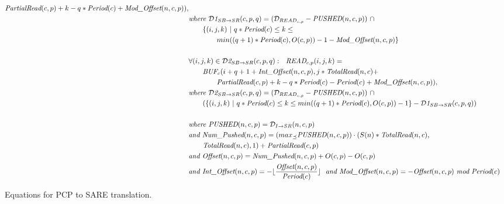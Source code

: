 \begin{figure}[ht]
{\begin{minipage}{6.3in}
\begin{itemize}
\begin{align}
                    \mt{PartialRead}(c,p) + k
                   - q * \mt{Period}(c) + \mt{Mod\_Offset}(n,c,p)), \\
&\mt{where }{{\cal D}\mt{1}}_{SB \rightarrow SR}(c,p,q) = 
  ({\cal D}_{{READ}_{c, p}} - \mt{PUSHED}(n,c,p))
                         ~\cap~ \\ \nonumber
	&~~~~~~\{ (i,j,k)~|~q * \mt{Period}(c)
                                \le k 
                                \le \\ \nonumber
	&~~~~~~~~~~~~min((q+1)*\mt{Period}(c),
         O(c, p)) - 1 
         - \mt{Mod\_Offset}(n,c,p) \}\\ \nonumber\\
\label{buf2read1}
%
%
&\forall (i,j,k) \in {{\cal D}\mt{2}}_{SB \rightarrow SR}(c,p,q):~~
\mt{READ}_{c, p}(i,j,k) = \nonumber\\
    &~~~~~~\mt{BUF}_{c}(i+q+
                  1 + \mt{Int\_Offset}(n,c,p),
                  j*\mt{TotalRead}(n,c) + \\\nonumber
                    &~~~~~~~~~~~~\mt{PartialRead}(c,p)
		+ k
                   - q * \mt{Period}(c) 
                   - \mt{Period}(c)
 + \mt{Mod\_Offset}(n,c,p)),\\ \nonumber&
\mt{where }{{\cal D}\mt{2}}_{SB \rightarrow SR}(c,p,q) = 
  ({\cal D}_{{READ}_{c, p}} - \mt{PUSHED}(n,c,p)) ~\cap~ \\ \nonumber
                         &~~~~~~( \{ (i,j,k)~|~q * \mt{Period}(c)
                                \le k 
                                \le min((q+1)*\mt{Period}(c),
                                O(c, p)) - 1 \} - {{\cal D}\mt{1}}_{SB \rightarrow SR}(c,p,q) )\\ \nonumber \\
\label{buf2read2}
%
%
&\mt{where }\mt{PUSHED}(n,c,p) = {\cal D}_{I \rightarrow SR}(n,c,p) \nonumber\\ \nonumber
&\mt{and }\mt{Num\_Pushed}(n,c,p) = 
  (max_{\preceq}\mt{PUSHED}(n,c,p)) \cdot (S(n) * \mt{TotalRead}(n,c), \\ \nonumber
                                        &~~~~~~\mt{TotalRead}(n,c), 1 ) + \mt{PartialRead}(c, p) \\ \nonumber
&\mt{and }\mt{Offset}(n,c,p) = \mt{Num\_Pushed}(n,c,p) + O(c,p)-O(c,p) \\ \nonumber
&\mt{and }\mt{Int\_Offset}(n,c,p) = - \lfloor \frac{\mt{Offset}(n,c,p)}{\mt{Period}(c)} \rfloor 
~~\mt{and }\mt{Mod\_Offset}(n,c,p) = - \mt{Offset}(n,c,p)~\mt{mod}~\mt{Period}(c) \nonumber
%
\end{align}
\vspace{-12pt}
\end{itemize}
\end{minipage}}
\caption{Equations for PCP to SARE translation.
\protect\label{fig:pcptosare3}}
\end{figure}